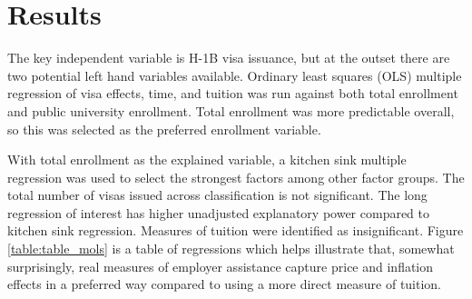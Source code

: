 \documentclass[review]{elsarticle}
\begin{document}
    \section{Results}

    The key independent variable is H-1B visa issuance, but at the outset there are two potential left hand variables available.
    Ordinary least squares (OLS) multiple regression of visa effects, time, and tuition was run against both total enrollment and public university enrollment.
    Total enrollment was more predictable overall, so this was selected as the preferred enrollment variable.

    With total enrollment as the explained variable,
    a kitchen sink multiple regression was used to select the strongest factors among other factor groups.
    The total number of visas issued across classification is not significant.
    The long regression of interest has higher unadjusted explanatory power compared to kitchen sink regression.
    Measures of tuition were identified as insignificant.
    Figure \ref{table:table_mols} is a table of regressions which helps illustrate that, somewhat surprisingly,
    real measures of employer assistance capture price and inflation effects in a preferred way
    compared to using a more direct measure of tuition.
    
\end{document}
